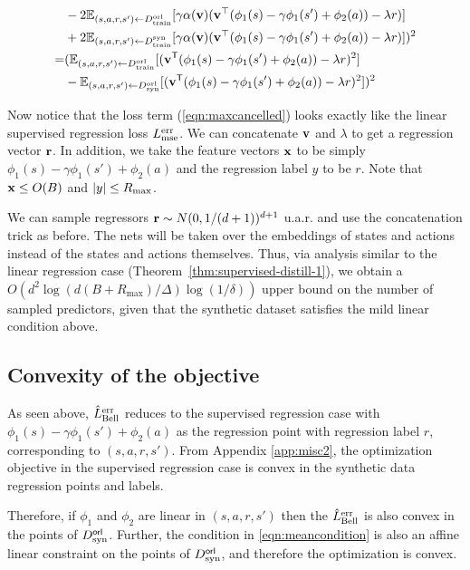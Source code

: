 \begin{align}
&- 2\mathbb{E}_{(s,a, r,s') \leftarrow D_{\textnormal{train}}^{\textnormal{orl}}}[\gamma\alpha({\mathbf{v}})({\mathbf{v}}^\top (\phi_1(s)- \gamma \phi_1(s') + \phi_2(a)) - \lambda r) ]\nonumber\\
&+ 2\mathbb{E}_{(s,a, r,s') \leftarrow D_{\textnormal{train}}^{\textnormal{syn}}}[\gamma\alpha({\mathbf{v}})({\mathbf{v}}^\top (\phi_1(s)- \gamma \phi_1(s') + \phi_2(a)) - \lambda r)]
)^2\nonumber \\
=& (\mathbb{E}_{(s, a, r, s')
 \leftarrow D_{\textnormal{train}}^{\textnormal{orl}}}[(\mathbf{v}^{\sf{T}}(\phi_1(s) - \gamma \phi_1(s') + \phi_2(a)) - \lambda r)^2] \nonumber \\
 &- \mathbb{E}_{(s, a, r, s')
 \leftarrow D_{\textnormal{syn}}^{\textnormal{orl}}}[(\mathbf{v}^{\sf{T}}(\phi_1(s) - \gamma \phi_1(s') + \phi_2(a)) - \lambda r)^2])^2 \label{eqn:maxcancelled}
\end{align}

Now notice that the loss term (\ref{eqn:maxcancelled}) looks exactly like the linear supervised regression loss $L_{\textnormal{mse}}^{\textnormal{err}}$. We can concatenate ${\mathbf{v}}$ and $\lambda$ to get a regression vector ${\mathbf{r}}$. In addition, we take the feature vectors ${\mathbf{x}}$ to be simply $\phi_1(s) - \gamma \phi_1(s') + \phi_2(a)$ and the regression label $y$ to be $r$. Note that ${\mathbf{x}} \leq O(B)$ and $|y| \leq R_{\textnormal{max}}$.

We can sample regressors ${\mathbf{r}} \sim N(0,1/(d+1))^{d+1}$ u.a.r. and use the concatenation trick as before. The nets will be taken over the embeddings of states and actions instead of the states and actions themselves. Thus, via analysis similar to the linear regression case (Theorem~\ref{thm:supervised-distill-1}), we obtain a $O\left({d^2}\log({d}(B+R_{\max})/{\Delta})\log(1/\delta)\right)$ upper bound on the number of sampled predictors, given that the synthetic dataset satisfies the mild linear condition above.

\subsection{Convexity of the objective}
As seen above, $\hat{L}^{\textnormal{err}}_{\textnormal{Bell}}$ reduces to the supervised regression case with $\phi_1(s) - \gamma\phi_1(s') + \phi_2(a)$ as the regression point with regression label $r$, corresponding to $(s,a,r,s')$. From Appendix \ref{app:misc2}, the optimization objective in the supervised regression case is convex in the synthetic data regression points and labels. 

Therefore, if $\phi_1$ and $\phi_2$ are linear in $(s,a,r,s')$ then the $\hat{L}^{\textnormal{err}}_{\textnormal{Bell}}$ is also convex in the points of $D^{\sf orl}_{\textnormal{syn}}$.
Further, the condition in \eqref{eqn:meancondition} is also an affine linear constraint on the points of $D^{\sf orl}_{\textnormal{syn}}$, and therefore the optimization is convex.